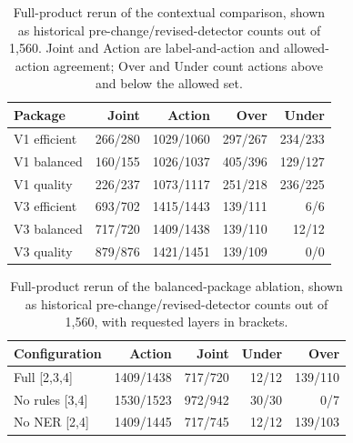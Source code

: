 \documentclass[sigconf]{acmart}
\theoremstyle{acmdefinition}\newtheorem{property}{Property}
\begin{document}
\begin{table}[t]
\centering
\caption{Full-product rerun of the contextual comparison, shown as historical pre-change/revised-detector counts out of 1,560. Joint and Action are label-and-action and allowed-action agreement; Over and Under count actions above and below the allowed set.}
\label{tab:rerun_units}
\small
\setlength{\tabcolsep}{4pt}
\begin{tabular}{lrrrr}
\toprule
Package & Joint & Action & Over & Under \\
\midrule
V1 efficient &266/280 &1029/1060 &297/267 &234/233 \\
V1 balanced &160/155 &1026/1037 &405/396 &129/127 \\
V1 quality &226/237 &1073/1117 &251/218 &236/225 \\
V3 efficient &693/702 &1415/1443 &139/111 &6/6 \\
V3 balanced &717/720 &1409/1438 &139/110 &12/12 \\
V3 quality &879/876 &1421/1451 &139/109 &0/0 \\
\bottomrule
\end{tabular}
\end{table}

\begin{table}[t]
\centering
\caption{Full-product rerun of the balanced-package ablation, shown as historical pre-change/revised-detector counts out of 1,560, with requested layers in brackets.}
\label{tab:rerun_ablation}
\small
\setlength{\tabcolsep}{4pt}
\begin{tabular}{lrrrr}
\toprule
Configuration & Action & Joint & Under & Over \\
\midrule
Full [2,3,4] &1409/1438 &717/720 &12/12 &139/110 \\
No rules [3,4] &1530/1523 &972/942 &30/30 &0/7 \\
No NER [2,4] &1409/1445 &717/745 &12/12 &139/103 \\
\bottomrule
\end{tabular}
\end{table}
\end{document}
